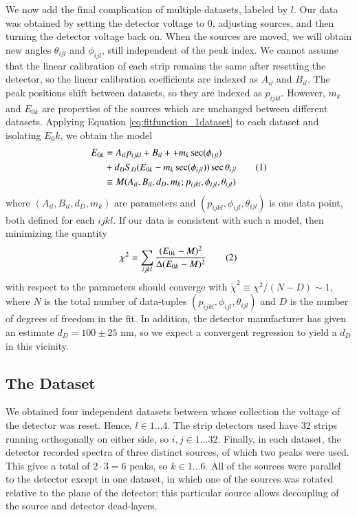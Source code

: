 \documentclass[11pt]{article}
\newcommand{\eqrefn}[1]{Equation \ref{eq:#1}}
\newcommand\numberthis{\addtocounter{equation}{1}\tag{\theequation}}
\begin{document}
\begin{multicols}{2}
We now add the final complication of multiple datasets, labeled by $l$. Our data was obtained by setting the detector voltage to 0, adjusting sources, and then turning the detector voltage back on. When the sources are moved, we will obtain new angles $\theta_{ijl}$ and $\phi_{ijl}$, still independent of the peak index. We cannot assume that the linear calibration of each strip remains the same after resetting the detector, so the linear calibration coefficients are indexed as $ A_{il} $ and $B_{il}$. The peak positions shift between datasets, so they are indexed as $ p_{ijkl}$. However, $m_k$ and $E_{0k}$ are properties of the sources which are unchanged between different datasets. Applying \eqrefn{fitfunction_1dataset} to each dataset and isolating $E_0{k}$, we obtain the model
	\begin{align*}
 		 E_{0k}  &= A_{il} p_{ijkl} + B_{il } +   + m_k \sec (\phi_{ijl}) 
			\\ &  + d_D  S_D( E_{0k} - m_k \sec (\phi_{ijl} ) ) \sec \theta_{ijl}
				  \numberthis \label{eq:fitfunction}
			\\ & \equiv M(A_{il}, B_{il}, d_D, m_k ; p_{ijkl}, \phi_{ijl} ,  \theta_{ijl} )
	\end{align*}	
where $(A_{il}, B_{il}, d_D, m_k )$ are parameters and   $ (p_{ijkl}, \phi_{ijl} ,  \theta_{ijl}) $ is one data point, both defined for each $ijkl$. 
If our data is consistent with such a model, then minimizing the quantity 
\[  \chi^2  = \sum_{ ijkl} \frac{ ( E_{0k} - M)^2 }{ \Delta ( E_{0k} -  M )^2 } 
	\numberthis \label{eq:chi2}\]
with respect to the parameters should converge with $ \tilde{\chi}^2 \equiv \chi^2 / (N - D) \sim 1$, where $N$ is the total number of data-tuples $ (p_{ijkl}, \phi_{ijl} ,  \theta_{ijl} ) $ and $D$ is the number of degrees of freedom in the fit. In addition, the detector manufacturer has given an estimate $d_D = 100 \pm 25 $ nm, so we expect a convergent regression to yield a $d_D$ in this vicinity.





\subsection{The Dataset}

We obtained four independent datasets between whose collection the voltage of the detector was reset. Hence, $l \in 1 \hdots 4$. The strip detectors used have 32 strips running orthogonally on either side, so $i,j \in 1 \hdots 32 $. Finally, in each dataset, the detector recorded spectra of three distinct sources, of which two peaks were used. This gives a total of $2 \cdot 3 = 6 $ peaks, so $ k \in 1 \hdots 6$. All of the sources were parallel to the detector except in one dataset, in which one of the sources was rotated relative to the plane of the detector; this particular source allows decoupling of the source and detector dead-layers.


\end{multicols}
\end{document}
